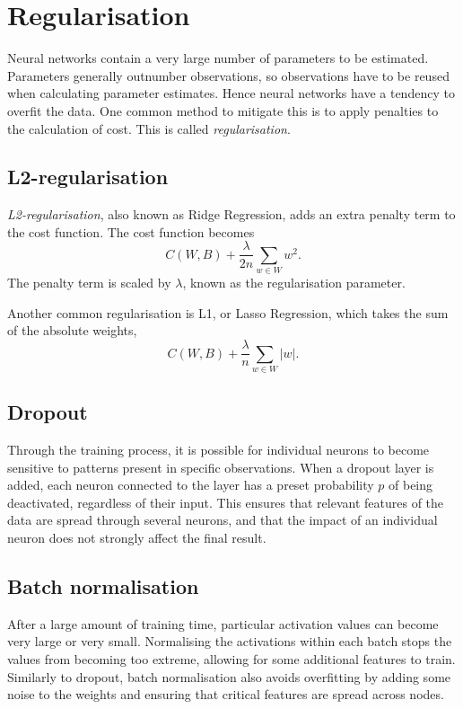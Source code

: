 \section{Regularisation}\label{nnet-reg}

Neural networks contain a very large number of parameters to be estimated. Parameters generally outnumber observations, so observations have to be reused when calculating parameter estimates. Hence neural networks have a tendency to overfit the data. One common method to mitigate this is to apply penalties to the calculation of cost. This is called \textit{regularisation}.

\subsection*{L2-regularisation}\label{nnet-l2reg}


\textit{L2-regularisation}, also known as Ridge Regression, adds an extra penalty term to the cost function. The cost function becomes
\[
	C(W,B) + \dfrac{\lambda}{2n}\sum_{w\in W}w^2.
\]
The penalty term is scaled by $\lambda$, known as the regularisation parameter. 

Another common regularisation is L1, or Lasso Regression, which takes the sum of the absolute weights,
\[
	C(W,B) + \dfrac{\lambda}{n}\sum_{w\in W}|w|.
\]

\subsection*{Dropout}\label{nnet-dropout}

Through the training process, it is possible for individual neurons to become sensitive to patterns present in specific observations. When a dropout layer is added, each neuron connected to the layer has a preset probability $p$ of being deactivated, regardless of their input. This ensures that relevant features of the data are spread through several neurons, and that the impact of an individual neuron does not strongly affect the final result.

\subsection*{Batch normalisation}

After a large amount of training time, particular activation values can become very large or very small. Normalising the activations within each batch stops the values from becoming too extreme, allowing for some additional features to train. Similarly to dropout, batch normalisation also avoids overfitting by adding some noise to the weights and ensuring that critical features are spread across nodes.


